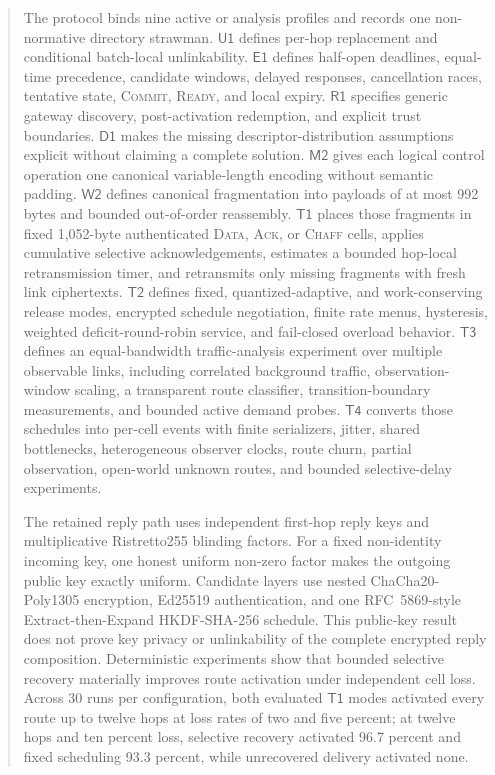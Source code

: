 \documentclass[11pt,oneside]{article}
\newcommand{\Uone}{\ensuremath{\mathsf{U1}}}
\newcommand{\Eone}{\ensuremath{\mathsf{E1}}}
\newcommand{\Rone}{\ensuremath{\mathsf{R1}}}
\newcommand{\Mtwo}{\ensuremath{\mathsf{M2}}}
\newcommand{\Wtwo}{\ensuremath{\mathsf{W2}}}
\newcommand{\Tone}{\ensuremath{\mathsf{T1}}}
\newcommand{\Ttwo}{\ensuremath{\mathsf{T2}}}
\newcommand{\Tthree}{\ensuremath{\mathsf{T3}}}
\newcommand{\Tfour}{\ensuremath{\mathsf{T4}}}
\newcommand{\Done}{\ensuremath{\mathsf{D1}}}
\begin{document}
\begin{abstract}
The protocol binds nine active or analysis profiles and records one non-normative directory strawman. \Uone{} defines per-hop replacement and conditional batch-local unlinkability. \Eone{} defines half-open deadlines, equal-time precedence, candidate windows, delayed responses, cancellation races, tentative state, \textsc{Commit}, \textsc{Ready}, and local expiry. \Rone{} specifies generic gateway discovery, post-activation redemption, and explicit trust boundaries. \Done{} makes the missing descriptor-distribution assumptions explicit without claiming a complete solution. \Mtwo{} gives each logical control operation one canonical variable-length encoding without semantic padding. \Wtwo{} defines canonical fragmentation into payloads of at most 992 bytes and bounded out-of-order reassembly. \Tone{} places those fragments in fixed 1,052-byte authenticated \textsc{Data}, \textsc{Ack}, or \textsc{Chaff} cells, applies cumulative selective acknowledgements, estimates a bounded hop-local retransmission timer, and retransmits only missing fragments with fresh link ciphertexts. \Ttwo{} defines fixed, quantized-adaptive, and work-conserving release modes, encrypted schedule negotiation, finite rate menus, hysteresis, weighted deficit-round-robin service, and fail-closed overload behavior. \Tthree{} defines an equal-bandwidth traffic-analysis experiment over multiple observable links, including correlated background traffic, observation-window scaling, a transparent route classifier, transition-boundary measurements, and bounded active demand probes. \Tfour{} converts those schedules into per-cell events with finite serializers, jitter, shared bottlenecks, heterogeneous observer clocks, route churn, partial observation, open-world unknown routes, and bounded selective-delay experiments.

The retained reply path uses independent first-hop reply keys and multiplicative Ristretto255 blinding factors. For a fixed non-identity incoming key, one honest uniform non-zero factor makes the outgoing public key exactly uniform. Candidate layers use nested ChaCha20-Poly1305 encryption, Ed25519 authentication, and one RFC~5869-style Extract-then-Expand HKDF-SHA-256 schedule. This public-key result does not prove key privacy or unlinkability of the complete encrypted reply composition. Deterministic experiments show that bounded selective recovery materially improves route activation under independent cell loss. Across 30 runs per configuration, both evaluated \Tone{} modes activated every route up to twelve hops at loss rates of two and five percent; at twelve hops and ten percent loss, selective recovery activated 96.7 percent and fixed scheduling 93.3 percent, while unrecovered delivery activated none.


\end{abstract}
\end{document}
